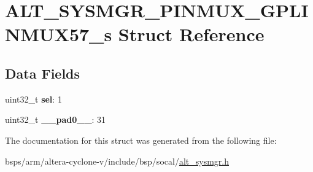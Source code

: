 \hypertarget{structALT__SYSMGR__PINMUX__GPLINMUX57__s}{}\section{A\+L\+T\+\_\+\+S\+Y\+S\+M\+G\+R\+\_\+\+P\+I\+N\+M\+U\+X\+\_\+\+G\+P\+L\+I\+N\+M\+U\+X57\+\_\+s Struct Reference}
\label{structALT__SYSMGR__PINMUX__GPLINMUX57__s}
\subsection*{Data Fields}
\begin{DoxyCompactItemize}
\item 
\mbox{\label{structALT__SYSMGR__PINMUX__GPLINMUX57__s_aba54301869fc89a22db366a1498036dd}} 
uint32\+\_\+t {\bfseries sel}\+: 1
\item 
\mbox{\label{structALT__SYSMGR__PINMUX__GPLINMUX57__s_ad533f3fe033cbecd52f5181502117ec1}} 
uint32\+\_\+t {\bfseries \+\_\+\+\_\+pad0\+\_\+\+\_\+}\+: 31
\end{DoxyCompactItemize}


The documentation for this struct was generated from the following file\+:\begin{DoxyCompactItemize}
\item 
bsps/arm/altera-\/cyclone-\/v/include/bsp/socal/\mbox{\hyperlink{alt__sysmgr_8h}{alt\+\_\+sysmgr.\+h}}\end{DoxyCompactItemize}
